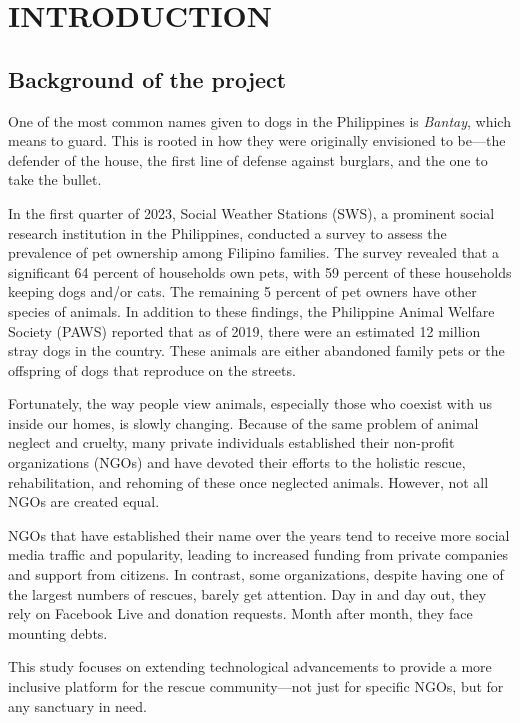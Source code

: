 \section{INTRODUCTION}
    \subsection{Background of the project}

            One of the most common names given to dogs in the Philippines is \textit{Bantay}, which means to guard. This is rooted in how they were originally envisioned to be—the defender of the house, the first line of defense against burglars, and the one to take the bullet.

            In the first quarter of 2023, Social Weather Stations (SWS), a prominent social research institution in the Philippines, conducted a survey to assess the prevalence of pet ownership among Filipino families. The survey revealed that a significant 64 percent of households own pets, with 59 percent of these households keeping dogs and/or cats. The remaining 5 percent of pet owners have other species of animals. In addition to these findings, the Philippine Animal Welfare Society (PAWS) reported that as of 2019, there were an estimated 12 million stray dogs in the country. These animals are either abandoned family pets or the offspring of dogs that reproduce on the streets.
            
            Fortunately, the way people view animals, especially those who coexist with us inside our homes, is slowly changing. Because of the same problem of animal neglect and cruelty, many private individuals established their non-profit organizations (NGOs) and have devoted their efforts to the holistic rescue, rehabilitation, and rehoming of these once neglected animals. However, not all NGOs are created equal.
            
            NGOs that have established their name over the years tend to receive more social media traffic and popularity, leading to increased funding from private companies and support from citizens. In contrast, some organizations, despite having one of the largest numbers of rescues, barely get attention. Day in and day out, they rely on Facebook Live and donation requests. Month after month, they face mounting debts.
            
            This study focuses on extending technological advancements to provide a more inclusive platform for the rescue community—not just for specific NGOs, but for any sanctuary in need.

